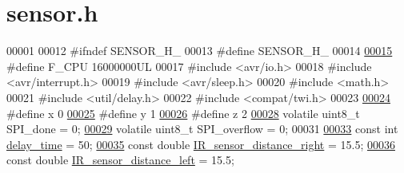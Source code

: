 \hypertarget{sensor_8h_source}{}\section{sensor.\+h}
\label{sensor_8h_source}

\begin{DoxyCode}
00001 
00012 \textcolor{preprocessor}{#ifndef SENSOR\_H\_}
00013 \textcolor{preprocessor}{#define SENSOR\_H\_}
00014 
\hypertarget{sensor_8h_source.tex_l00015}{}\hyperlink{sensor_8h_a43bafb28b29491ec7f871319b5a3b2f8}{00015} \textcolor{preprocessor}{#define F\_CPU 16000000UL    }
00017 \textcolor{preprocessor}{#include <avr/io.h>}
00018 \textcolor{preprocessor}{#include <avr/interrupt.h>}
00019 \textcolor{preprocessor}{#include <avr/sleep.h>}
00020 \textcolor{preprocessor}{#include <math.h>}
00021 \textcolor{preprocessor}{#include <util/delay.h>}
00022 \textcolor{preprocessor}{#include <compat/twi.h>}
00023 
\hypertarget{sensor_8h_source.tex_l00024}{}\hyperlink{sensor_8h_a6c4b361d72eb3767ba424ac9a6ecf52b}{00024} \textcolor{preprocessor}{#define x 0             }
\hypertarget{sensor_8h_source.tex_l00025}{}\hyperlink{sensor_8h_a0ed6a908288e0cd87f79c1b5ab56d07c}{00025} \textcolor{preprocessor}{#define y 1             }
\hypertarget{sensor_8h_source.tex_l00026}{}\hyperlink{sensor_8h_afb573e69f3b198fe9ca91079c4a402a9}{00026} \textcolor{preprocessor}{#define z 2             }
\hypertarget{sensor_8h_source.tex_l00028}{}\hyperlink{sensor_8h_a320a1ee237ba550bcdffd131a4198e17}{00028} \textcolor{preprocessor}{volatile uint8\_t SPI\_done = 0;      }
\hypertarget{sensor_8h_source.tex_l00029}{}\hyperlink{sensor_8h_a2c687b5d4d67e6900cd35ec11107a4ee}{00029} \textcolor{preprocessor}{volatile uint8\_t SPI\_overflow = 0;  }
00031 \textcolor{preprocessor}{}
\hypertarget{sensor_8h_source.tex_l00033}{}\hyperlink{sensor_8h_abf692cf614d069eb741fe7ee8a5bd31d}{00033} \textcolor{keyword}{const} \textcolor{keywordtype}{int} \hyperlink{sensor_8h_abf692cf614d069eb741fe7ee8a5bd31d}{delay\_time} = 50;            
\hypertarget{sensor_8h_source.tex_l00035}{}\hyperlink{sensor_8h_ae76d77cd1b87b203973ac8baa4081271}{00035} \textcolor{keyword}{const} \textcolor{keywordtype}{double} \hyperlink{sensor_8h_ae76d77cd1b87b203973ac8baa4081271}{IR\_sensor\_distance\_right} = 15.5;       
\hypertarget{sensor_8h_source.tex_l00036}{}\hyperlink{sensor_8h_a85db4bba6dcce96787150b0aa1c9c978}{00036} \textcolor{keyword}{const} \textcolor{keywordtype}{double} \hyperlink{sensor_8h_a85db4bba6dcce96787150b0aa1c9c978}{IR\_sensor\_distance\_left} = 15.5;     

\end{DoxyCode}
